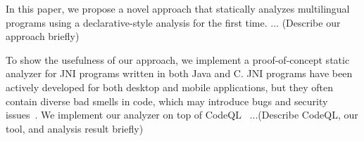In this paper, we propose a novel approach that statically analyzes
multilingual programs using a declarative-style analysis for the first time. 
... (Describe our approach briefly)




To show the usefulness of our approach, we implement a proof-of-concept static
analyzer for JNI programs written in both Java and C. JNI programs have been
actively developed for both desktop and mobile applications, but they often
contain diverse bad smells in code, which may introduce bugs and security
issues~\cite{nishiwaki2012sean, grichi2019state, abidi2019behind,
abidi2021multi}. We implement our analyzer on top of CodeQL~\cite{codeql}
...(Describe CodeQL, our tool, and analysis result briefly)

